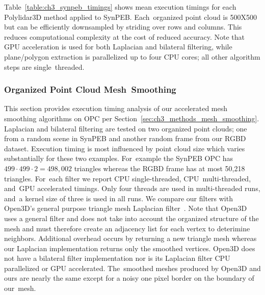 Table~\ref{table:ch3_synpeb_timings} shows mean execution timings for each Polylidar3D method applied to SynPEB.  Each~organized point cloud is 500X500 but can be efficiently downsampled by striding over rows and columns. This reduces computational complexity at the cost of reduced accuracy. Note that \ac{GPU} acceleration is used for both Laplacian and bilateral filtering, while plane/polygon extraction is parallelized up to four CPU cores; all other algorithm steps are single~threaded. 

\begin{table}[H]
\centering
\caption{Mean execution timings (ms) and accuracy of Polylidar3D on~SynPEB}
\label{table:ch3_synpeb_timings}
\end{table}
\unskip


\subsubsection{Organized Point Cloud Mesh~Smoothing}

This section provides execution timing analysis of our accelerated mesh smoothing algorithms on \ac{OPC} per Section~\ref{sec:ch3_methods_mesh_smoothing}. Laplacian and bilateral filtering are tested on two organized point clouds; one from a random scene in SynPEB and another random frame from our \ac{RGBD} dataset.  Execution timing is most influenced by point cloud size which varies substantially for these two examples. For~example the SynPEB \ac{OPC} has $499 \cdot 499 \cdot 2 = 498,002$ triangles whereas the \ac{RGBD} frame has at most 50,218 triangles. For~each filter we report CPU single-threaded, CPU~multi-threaded, and~\ac{GPU} accelerated timings. Only four threads are used in multi-threaded runs, and~a kernel size of three is used in all runs. We compare our filters with Open3D's general purpose triangle mesh Laplacian filter~\cite{zhou_open3d_2018}. Note that Open3D uses a general filter and does not take into account the organized structure of the mesh and must therefore create an adjacency list for each vertex to deterimine neighbors. Additional overhead occurs by returning a new triangle mesh whereas our Laplacian implementation returns only the smoothed vertices. Open3D does not have a bilateral filter implementation nor is its Laplacian filter CPU parallelized or \ac{GPU} accelerated. The~smoothed meshes produced by Open3D and ours are nearly the same except for a noisy one pixel border on the boundary of our~mesh.  

